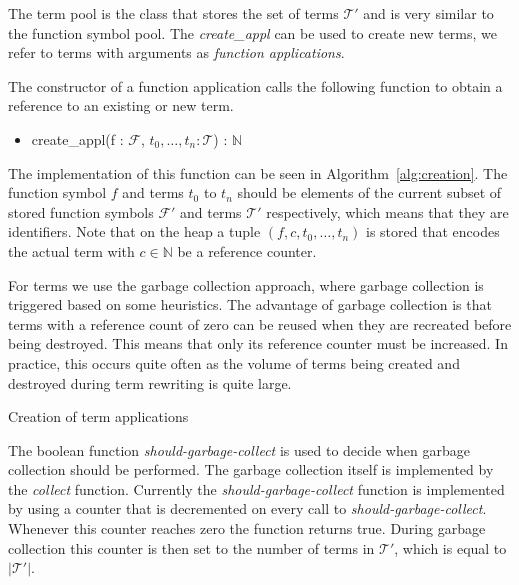 \documentclass[10pt,a4paper]{article}
\theoremstyle{definition}
\newcommand{\naturalnumbers}{\mathbb{N}}
\newcommand{\functionsymbols}{\mathcal{F}}
\newcommand{\terms}{\mathcal{T}}
\renewcommand{\gets}{:=}
\begin{document}
The term pool is the class that stores the set of terms $\terms'$ and is very similar to the function symbol pool.
The \emph{create\_appl} can be used to create new terms, we refer to terms with arguments as \emph{function applications}.

The constructor of a function application calls the following function to obtain a reference to an existing or new term.

\begin{itemize}    
	\item create\_appl(f : $\functionsymbols$, $t_0, \ldots, t_n : \terms$) : $\naturalnumbers$
\end{itemize}

\noindent The implementation of this function can be seen in Algorithm~\ref{alg:creation}.
The function symbol $f$ and terms $t_0$ to $t_n$ should be elements of the current subset of stored function symbols $\functionsymbols'$ and terms $\terms'$ respectively, which means that they are identifiers.
Note that on the heap a tuple $(f, c, t_0, \ldots, t_n)$ is stored that encodes the actual term with $c \in \naturalnumbers$ be a reference counter.

For terms we use the garbage collection approach, where garbage collection is triggered based on some heuristics.
The advantage of garbage collection is that terms with a reference count of zero can be reused when they are recreated before being destroyed.
This means that only its reference counter must be increased.
In practice, this occurs quite often as the volume of terms being created and destroyed during term rewriting is quite large.

\begin{algorithm}[H]
 \caption{Creation of term applications}\label{alg:creation}
 \begin{algorithmic}[1]
  \If {$\terms'[f, t_0,\ldots, t_n] \neq \bot$}
	 \State {\textbf{return} $\terms'[f, t_0,\ldots, t_n]$}
  \EndIf
  
  \State {$t \gets \text{construct}(f,t_0,\ldots,t_n)$}
  
  \EndIf
  
  \State {$\terms' \gets \terms' \cup \{t\}$}
  \EndProcedure
\end{algorithmic}
\end{algorithm}

\noindent The boolean function \emph{should-garbage-collect} is used to decide when garbage collection should be performed.
The garbage collection itself is implemented by the \emph{collect} function.
Currently the \emph{should-garbage-collect} function is implemented by using a counter that is decremented on every call to \emph{should-garbage-collect}.
Whenever this counter reaches zero the function returns true.
During garbage collection this counter is then set to the number of terms in $\terms'$, which is equal to $|\terms'|$.
\end{document}
